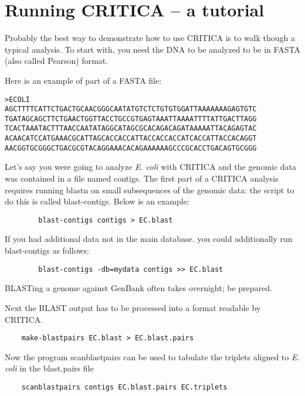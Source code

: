 \documentclass{article}
\begin{document}
\section{Running CRITICA -- a tutorial}

Probably the best way to demonstrate how to use CRITICA is to walk
though a typical analysis. To start with, you need the DNA to be
analyzed to be in FASTA (also called Pearson) format. \begin{samepage}
Here is an example of part of a FASTA file:

\begin{verbatim}
>ECOLI
AGCTTTTCATTCTGACTGCAACGGGCAATATGTCTCTGTGTGGATTAAAAAAAGAGTGTC
TGATAGCAGCTTCTGAACTGGTTACCTGCCGTGAGTAAATTAAAATTTTATTGACTTAGG
TCACTAAATACTTTAACCAATATAGGCATAGCGCACAGACAGATAAAAATTACAGAGTAC
ACAACATCCATGAAACGCATTAGCACCACCATTACCACCACCATCACCATTACCACAGGT
AACGGTGCGGGCTGACGCGTACAGGAAACACAGAAAAAAGCCCGCACCTGACAGTGCGGG
\end{verbatim}
\end{samepage}

Let's say you were going to analyze {\it E. coli} with CRITICA and the
genomic data was contained in a file named contigs. The first
part of a CRITICA analysis requires running blastn on small
subsequences of the genomic data: the script to do this is called
blast-contigs. Below is an example:

\begin{verbatim}
        blast-contigs contigs > EC.blast
\end{verbatim}

If you had additional data not in the main database. you could
additionally run blast-contigs as follows:

\begin{verbatim}
        blast-contigs -db=mydata contigs >> EC.blast
\end{verbatim}

BLASTing a genome against GenBank often takes overnight; be prepared.

Next the BLAST output has to be processed into a format
readable by CRITICA.

\begin{verbatim}
	make-blastpairs EC.blast > EC.blast.pairs
\end{verbatim}

Now the program scanblastpairs can be used to tabulate the
triplets aligned to {\it E. coli} in the blast.pairs
file

\begin{verbatim}
	scanblastpairs contigs EC.blast.pairs EC.triplets
\end{verbatim}
\end{document}
